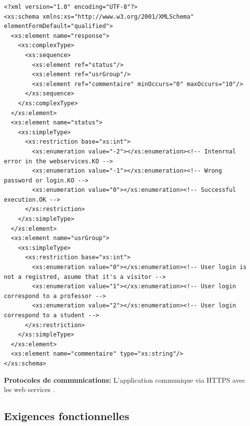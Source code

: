  \begin{lstlisting}[language=XSD,caption = Exemple de XML Schema fournit au service informatique de l'USJ]
<?xml version="1.0" encoding="UTF-8"?>
<xs:schema xmlns:xs="http://www.w3.org/2001/XMLSchema" elementFormDefault="qualified">
  <xs:element name="response">
    <xs:complexType>
      <xs:sequence>
        <xs:element ref="status"/>
        <xs:element ref="usrGroup"/>
        <xs:element ref="commentaire" minOccurs="0" maxOccurs="10"/>
      </xs:sequence>
    </xs:complexType>
  </xs:element>
  <xs:element name="status">
    <xs:simpleType>
      <xs:restriction base="xs:int">
        <xs:enumeration value="-2"></xs:enumeration><!-- Intenrnal error in the webservices.KO -->
        <xs:enumeration value="-1"></xs:enumeration><!-- Wrong password or login.KO -->
        <xs:enumeration value="0"></xs:enumeration><!-- Successful execution.OK -->
      </xs:restriction>
    </xs:simpleType>
  </xs:element>
  <xs:element name="usrGroup">
    <xs:simpleType>
      <xs:restriction base="xs:int">
        <xs:enumeration value="0"></xs:enumeration><!-- User login is not a registred, asume that it's a visitor -->
        <xs:enumeration value="1"></xs:enumeration><!-- User login correspond to a professor -->
        <xs:enumeration value="2"></xs:enumeration><!-- User login correspond to a student -->
      </xs:restriction>
    </xs:simpleType>
  </xs:element>
  <xs:element name="commentaire" type="xs:string"/>
</xs:schema>
			\end{lstlisting}

	\textbf{Protocoles de communications:} L'application communique via HTTPS avec les web services . \\[0.2cm]
	\subsection{Exigences fonctionnelles \label{exigenceFoction}}
	
